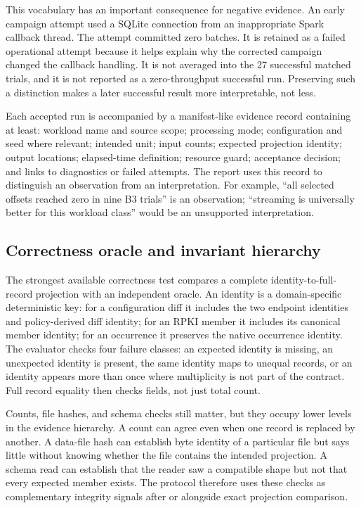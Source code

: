 This vocabulary has an important consequence for negative evidence. An early campaign attempt used a SQLite connection from an inappropriate Spark callback thread. The attempt committed zero batches. It is retained as a failed operational attempt because it helps explain why the corrected campaign changed the callback handling. It is not averaged into the 27 successful matched trials, and it is not reported as a zero-throughput successful run. Preserving such a distinction makes a later successful result more interpretable, not less.

Each accepted run is accompanied by a manifest-like evidence record containing at least: workload name and source scope; processing mode; configuration and seed where relevant; intended unit; input counts; expected projection identity; output locations; elapsed-time definition; resource guard; acceptance decision; and links to diagnostics or failed attempts. The report uses this record to distinguish an observation from an interpretation. For example, ``all selected offsets reached zero in nine B3 trials'' is an observation; ``streaming is universally better for this workload class'' would be an unsupported interpretation.

\subsection{Correctness oracle and invariant hierarchy}

The strongest available correctness test compares a complete identity-to-full-record projection with an independent oracle. An identity is a domain-specific deterministic key: for a configuration diff it includes the two endpoint identities and policy-derived diff identity; for an RPKI member it includes its canonical member identity; for an occurrence it preserves the native occurrence identity. The evaluator checks four failure classes: an expected identity is missing, an unexpected identity is present, the same identity maps to unequal records, or an identity appears more than once where multiplicity is not part of the contract. Full record equality then checks fields, not just total count.

Counts, file hashes, and schema checks still matter, but they occupy lower levels in the evidence hierarchy. A count can agree even when one record is replaced by another. A data-file hash can establish byte identity of a particular file but says little without knowing whether the file contains the intended projection. A schema read can establish that the reader saw a compatible shape but not that every expected member exists. The protocol therefore uses these checks as complementary integrity signals after or alongside exact projection comparison.

